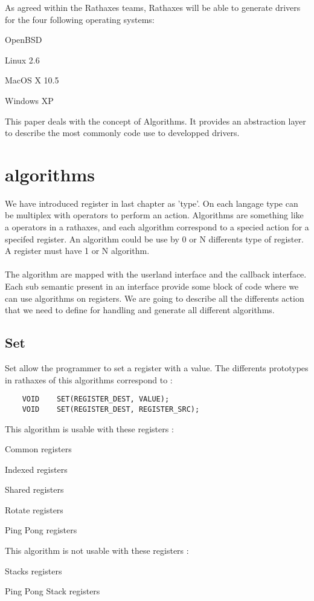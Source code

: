 \documentclass[11pt]{report}
\begin{document}
As agreed within the Rathaxes teams, Rathaxes will be able to generate drivers
for the four following operating systems:
\begin{description}
    \item{OpenBSD}
    \item{Linux 2.6}
    \item{MacOS X 10.5}
    \item{Windows XP}
\end{description}

This paper deals with the concept of Algorithms. It provides
an abstraction layer to describe the most commonly code use to 
developped drivers.

\tableofcontents

\chapter{algorithms}

We have introduced register in last chapter as 'type'. On each langage
type can be multiplex with operators to perform an action. Algorithms
are something like a operators in a rathaxes, and each algorithm correspond
to a specied action for a specifed register. An algorithm could be use
by 0 or N differents type of register. A register must have 1 or N algorithm.\\\\
The algorithm are mapped with the userland interface and the callback interface.
Each sub semantic present in an interface provide some block of code where we 
can use algorithms on registers. We are going to describe all the differents action 
that we need to define for handling and generate all different algorithms.

\section{Set}
Set allow the programmer to set a register with a value. The differents prototypes 
in rathaxes of this algorithms correspond to : 
\begin{lstlisting}
	VOID	SET(REGISTER_DEST, VALUE);
	VOID	SET(REGISTER_DEST, REGISTER_SRC);
\end{lstlisting}
This algorithm is usable with these registers : 
\begin{description}
	\item{Common registers}
	\item{Indexed registers}
	\item{Shared registers}
	\item{Rotate registers}
	\item{Ping Pong registers}
\end{description}
This algorithm is not usable with these registers : 
\begin{description}
	\item{Stacks registers}
	\item{Ping Pong Stack registers}
\end{description}
\end{document}
